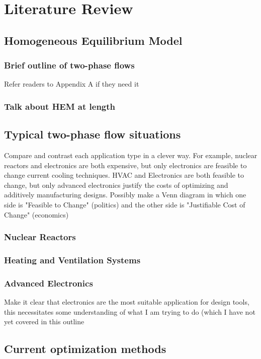 
\chapter{Literature Review} \label{chapter1:introduction}

\section{Homogeneous Equilibrium Model}
	\subsection{Brief outline of two-phase flows}
		\noindent Refer readers to Appendix A if they need it
	\subsection{Talk about HEM at length}
\section{Typical two-phase flow situations}
	\noindent Compare and contrast each application type in a clever way. For example, nuclear reactors and electronics are both expensive, but only electronics are feasible to change current cooling techniques. HVAC and Electronics are both feasible to change, but only advanced electronics justify the costs of optimizing and additively manufacturing designs. Possibly make a Venn diagram in which one side is "Feasible to Change" (politics) and the other side is "Justifiable Cost of Change" (economics)
	\subsection{Nuclear Reactors}
	\subsection{Heating and Ventilation Systems}
	\subsection{Advanced Electronics}
	\noindent Make it clear that electronics are the most suitable application for design tools, this necessitates some understanding of what I am trying to do (which I have not yet covered in this outline
\section{Current optimization methods}
